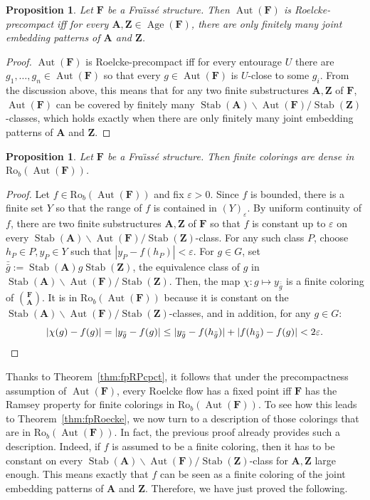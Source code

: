 \documentclass[11pt]{article}
\newtheorem{prop}[theo]{Proposition}
\theoremstyle{definition}
\numberwithin{equation}{section}
\numberwithin{figure}{section}
\numberwithin{table}{section}
\newcommand*{\mA}{\mathbf{A}}
\newcommand*{\mF}{\mathbf{F}}
\newcommand*{\mZ}{\mathbf{Z}}
\newcommand{\e}{\varepsilon}
\DeclareMathOperator{\Aut}{Aut}
\DeclareMathOperator{\Stab}{Stab}
\DeclareMathOperator{\Age}{Age}
\newcommand{\ROB}{\mathrm{Ro}_{b}}
\begin{document}
\begin{prop}\label{prop:Roelcke-precompact}
Let $\mF$ be a Fra\"{\i}ss\'e structure. Then $\Aut(\mF)$ is Roelcke-precompact iff for every $\mA, \mZ \in \Age(\mF)$, there are only finitely many joint embedding patterns of $\mA$ and $\mZ$.
\end{prop}

\begin{proof}
$\Aut(\mF)$ is Roelcke-precompact iff for every entourage $U$ there are\linebreak $g_{1},\ldots,g_{n}\in \Aut(\mF)$ so that every $g\in \Aut(\mF)$ is $U$-close to some $g_{i}$. From the discussion above, this means that for any two finite substructures $\mA, \mZ$ of $\mF$, $\Aut(\mF)$ can be covered by finitely many $\Stab(\mA)\backslash \Aut(\mF)/\Stab(\mZ)$-classes, which holds exactly when there are only finitely many joint embedding patterns of $\mA$ and $\mZ$.
\end{proof}

\begin{prop}
Let $\mF$ be a Fra\"{\i}ss\'e structure. Then finite colorings are dense in $\ROB(\Aut(\mF))$.
\end{prop}

\begin{proof}
Let $f\in \ROB(\Aut(\mF))$ and fix $\e>0$. Since $f$ is bounded, there is a finite set $Y$ so that the range of $f$ is contained in $(Y)_\e$. By uniform continuity of $f$, there are two finite substructures $\mA, \mZ$ of $\mF$ so that $f$ is constant up to $\e$ on every $\Stab(\mA)\backslash \Aut(\mF)/\Stab(\mZ)$-class. For any such class $P$, choose $ h_P\in P, y_P \in Y$ such that $|y_P - f(h_P)|<\e$. For $g\in G$, set $\bar{\bar g}:= \Stab(\mA)g\Stab(\mZ)$, the equivalence class of $g$ in $\Stab(\mA)\backslash
\Aut(\mF)/\Stab(\mZ)$. Then, the map $\chi : g\mapsto y_{\bar{\bar g}}$ is a finite coloring of $\binom{\mF}{\mA}$. It is in $\ROB(\Aut(\mF))$ because it is constant on the $\Stab(\mA)\backslash \Aut(\mF)/\Stab(\mZ)$-classes, and in addition, for any $g\in G$:
\begin{equation*}
|\chi(g)-f(g)|=|y_{\bar{\bar g}} - f(g)|\leq |y_{\bar{\bar g}}-f(h_{\bar{\bar g}})|+ |f(h_{\bar{\bar g}})-f(g)|<2\e.
\qedhere
\end{equation*}
\end{proof}

Thanks to Theorem~\ref{thm:fpRPcpct}, it follows that under the precompactness assumption of $\Aut(\mF)$, every Roelcke flow has a fixed point iff $\mF$ has the Ramsey property for finite colorings in $\ROB(\Aut(\mF))$. To see how this leads to Theorem~\ref{thm:fpRoecke}, we now turn to a description of those colorings that are in $\ROB(\Aut(\mF))$. In fact, the previous proof already provides such a description. Indeed, if $f$ is assumed to be a finite coloring, then it has to be constant on every $\Stab(\mA)\backslash \Aut(\mF)/\Stab(\mZ)$-class for $\mA, \mZ$ large enough. This means exactly that $f$ can be seen as a finite coloring of the joint embedding patterns of $\mA$ and $\mZ$. Therefore, we have just proved the following.
\end{document}

